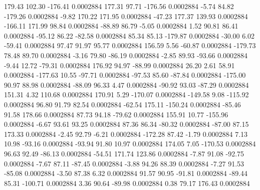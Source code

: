       179.43      102.30     -176.41     0.0002884
      177.31       97.71     -176.56     0.0002884
       -5.74       84.82     -179.26     0.0002884
       -9.82      170.22      171.95     0.0002884
      -47.23      177.37      139.93     0.0002884
     -166.11      171.99       98.84     0.0002884
      -88.89       86.79       -5.05     0.0002884
        1.52       90.81       86.41     0.0002884
      -95.12       86.22      -82.58     0.0002884
       85.34       85.13     -179.87     0.0002884
      -30.00        6.02      -59.41     0.0002884
       97.47       91.97       95.77     0.0002884
      156.59        5.56      -60.87     0.0002884
     -179.73       78.48       89.70     0.0002884
       -3.16       79.80      -86.19     0.0002884
       -2.85       89.93      -93.66     0.0002884
       -9.44       12.72      -79.31     0.0002884
      176.92       94.97      -88.99     0.0002884
       26.20        2.61       58.91     0.0002884
     -177.63       10.55      -97.71     0.0002884
      -97.53       85.60      -87.84     0.0002884
     -175.00       90.97       88.98     0.0002884
      -88.09       96.33        4.47     0.0002884
      -90.92       93.03      -87.29     0.0002884
      151.31        4.32      110.68     0.0002884
      170.91        5.29     -170.07     0.0002884
     -149.58        9.08     -115.92     0.0002884
       96.80       91.79       82.54     0.0002884
      -62.54      175.11     -150.24     0.0002884
      -85.46       91.58      178.66     0.0002884
       87.73       94.18      -79.62     0.0002884
      155.91       10.77     -155.96     0.0002884
       -6.67       93.61       93.25     0.0002884
       87.36       86.34      -80.32     0.0002884
      -87.00       87.15      173.33     0.0002884
       -2.45       92.79       -6.21     0.0002884
     -172.28       87.42       -1.79     0.0002884
        7.13       10.98      -93.16     0.0002884
      -93.94       91.80       10.97     0.0002884
      174.05        7.05     -170.53     0.0002884
       96.63       92.49      -86.13     0.0002884
      -54.51      171.74      123.86     0.0002884
       -7.87       91.08      -92.75     0.0002884
       -7.67       87.11      -87.45     0.0002884
       -3.88       94.26       88.39     0.0002884
       -7.27       91.53      -85.08     0.0002884
       -3.50       87.38        6.32     0.0002884
       91.57       90.95      -91.81     0.0002884
      -89.44       85.31     -100.71     0.0002884
        3.36       90.64      -89.98     0.0002884
        0.38       79.17      176.43     0.0002884
